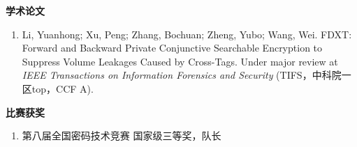 \begin{publications}

\textbf{学术论文}

\renewcommand{\labelenumi}{[\theenumi]}
\begin{enumerate}
    \item Li, Yuanhong; Xu, Peng; Zhang, Bochuan; Zheng, Yubo; Wang, Wei. FDXT: Forward and Backward Private Conjunctive Searchable Encryption to Suppress Volume Leakages Caused by Cross-Tags. Under major review at \textit{IEEE Transactions on Information Forensics and Security }(TIFS，中科院一区top，CCF A).
\end{enumerate}

\bigskip

\textbf{比赛获奖}
\renewcommand{\labelenumi}{[\theenumi]}
\begin{enumerate}
    \item 第八届全国密码技术竞赛 \hfill 国家级三等奖，队长
\end{enumerate}

\end{publications}